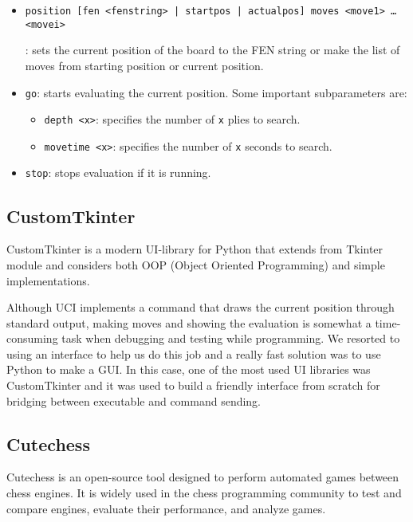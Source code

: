 \begin{itemize}
    \item \parbox{\textwidth}{\texttt{position [fen <fenstring> | startpos | actualpos] moves <move1> \ldots <movei>}}: sets the current position of the board to the FEN string or make the list of moves from starting position or current position.
    \item \texttt{go}: starts evaluating the current position. Some important subparameters are:
    \begin{itemize}
        \item \texttt{depth <x>}: specifies the number of \texttt{x} plies to search.
        \item \texttt{movetime <x>}: specifies the number of \texttt{x} seconds to search. 
    \end{itemize}
    \item \texttt{stop}: stops evaluation if it is running.
\end{itemize}

\subsection{CustomTkinter}

CustomTkinter is a modern UI-library for Python that extends from Tkinter module and considers both OOP (Object Oriented Programming) and simple implementations.

\vspace{1em}

\noindent Although UCI implements a command that draws the current position through standard output, making moves and showing the evaluation is somewhat a time-consuming task when debugging and testing while programming. We resorted to using an interface to help us do this job and a really fast solution was to use Python to make a GUI. In this case, one of the most used UI libraries was CustomTkinter and it was used to build a friendly interface from scratch for bridging between executable and command sending.

\subsection{Cutechess}

Cutechess is an open-source tool designed to perform automated games between chess engines. It is widely used in the chess programming community to test and compare engines, evaluate their performance, and analyze games.

